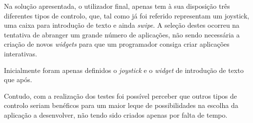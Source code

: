 Na solução apresentada, o utilizador final, apenas tem à sua disposição três diferentes tipos de controlo, que, tal como já foi referido representam um joystick, uma caixa para introdução de texto e ainda \textit{swipe}. A seleção destes ocorreu na tentativa de abranger um grande número de aplicações, não sendo necessária a criação de novos \textit{widgets} para que um programador consiga criar aplicações interativas. 

Inicialmente foram apenas definidos o \textit{joystick} e o \textit{widget} de introdução de texto que após.

Contudo, com a realização dos testes foi possível perceber que outros tipos de controlo seriam benéficos para um maior leque de possibilidades na escolha da aplicação a desenvolver, não tendo sido criados apenas por falta de tempo.








